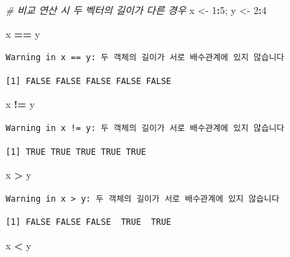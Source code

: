 \documentclass[
  11pt,
]{krantz}
\newenvironment{Shaded}{\begin{snugshade}}{\end{snugshade}}
\newcommand{\CommentTok}[1]{\textcolor[rgb]{0.37,0.37,0.37}{\textit{#1}}}
\newcommand{\DecValTok}[1]{\textcolor[rgb]{0.06,0.06,0.06}{#1}}
\newcommand{\NormalTok}[1]{#1}
\newcommand{\OperatorTok}[1]{\textcolor[rgb]{0.43,0.43,0.43}{\textbf{#1}}}
\newcommand{\StringTok}[1]{\textcolor[rgb]{0.5,0.5,0.5}{#1}}
\begin{document}
\begin{Shaded}
\begin{Highlighting}[]
\CommentTok{# 비교 연산 시 두 벡터의 길이가 다른 경우}
\NormalTok{x <-}\StringTok{ }\DecValTok{1}\OperatorTok{:}\DecValTok{5}\NormalTok{; y <-}\StringTok{ }\DecValTok{2}\OperatorTok{:}\DecValTok{4}

\NormalTok{x }\OperatorTok{==}\StringTok{ }\NormalTok{y}
\end{Highlighting}
\end{Shaded}

\begin{verbatim}
Warning in x == y: 두 객체의 길이가 서로 배수관계에 있지 않습니다
\end{verbatim}

\begin{verbatim}
[1] FALSE FALSE FALSE FALSE FALSE
\end{verbatim}

\begin{Shaded}
\begin{Highlighting}[]
\NormalTok{x }\OperatorTok{!=}\StringTok{ }\NormalTok{y}
\end{Highlighting}
\end{Shaded}

\begin{verbatim}
Warning in x != y: 두 객체의 길이가 서로 배수관계에 있지 않습니다
\end{verbatim}

\begin{verbatim}
[1] TRUE TRUE TRUE TRUE TRUE
\end{verbatim}

\begin{Shaded}
\begin{Highlighting}[]
\NormalTok{x }\OperatorTok{>}\StringTok{ }\NormalTok{y}
\end{Highlighting}
\end{Shaded}

\begin{verbatim}
Warning in x > y: 두 객체의 길이가 서로 배수관계에 있지 않습니다
\end{verbatim}

\begin{verbatim}
[1] FALSE FALSE FALSE  TRUE  TRUE
\end{verbatim}

\begin{Shaded}
\begin{Highlighting}[]
\NormalTok{x }\OperatorTok{<}\StringTok{ }\NormalTok{y}
\end{Highlighting}
\end{Shaded}
\end{document}
